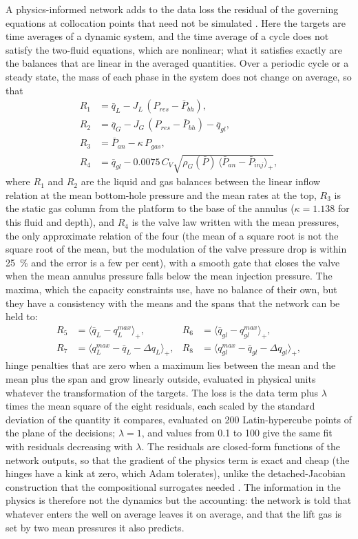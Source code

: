 \documentclass[a4paper,fleqn]{cas-sc}
\begin{document}
A physics-informed network adds to the data loss the residual of the governing equations at collocation points that need not be simulated \citep{raissi2019}. Here the targets are time averages of a dynamic system, and the time average of a cycle does not satisfy the two-fluid equations, which are nonlinear; what it satisfies exactly are the balances that are linear in the averaged quantities. Over a periodic cycle or a steady state, the mass of each phase in the system does not change on average, so that
\begin{align}
R_1 &= \bar q_L - J_L\,(P_{res} - \bar P_{bh}), \label{eq:r1}\\
R_2 &= \bar q_G - J_G\,(P_{res} - \bar P_{bh}) - \bar q_{gl}, \label{eq:r2}\\
R_3 &= \bar P_{an} - \kappa\,P_{gas}, \label{eq:r3}\\
R_4 &= \bar q_{gl} - 0.0075\,C_V\sqrt{\rho_G(\bar P)\,\langle \bar P_{an} - \bar P_{inj}\rangle_+}, \label{eq:r4}
\end{align}
where $R_1$ and $R_2$ are the liquid and gas balances between the linear inflow relation at the mean bottom-hole pressure and the mean rates at the top, $R_3$ is the static gas column from the platform to the base of the annulus ($\kappa = 1.138$ for this fluid and depth), and $R_4$ is the valve law written with the mean pressures, the only approximate relation of the four (the mean of a square root is not the square root of the mean, but the modulation of the valve pressure drop is within \SI{25}{\percent} and the error is a few per cent), with a smooth gate that closes the valve when the mean annulus pressure falls below the mean injection pressure. The maxima, which the capacity constraints use, have no balance of their own, but they have a consistency with the means and the spans that the network can be held to:
\begin{align}
R_5 &= \langle \bar q_L - q_L^{max}\rangle_+, & R_6 &= \langle \bar q_{gl} - q_{gl}^{max}\rangle_+, \label{eq:r56}\\
R_7 &= \langle q_L^{max} - \bar q_L - \Delta q_L\rangle_+, & R_8 &= \langle q_{gl}^{max} - \bar q_{gl} - \Delta q_{gl}\rangle_+, \label{eq:r78}
\end{align}
hinge penalties that are zero when a maximum lies between the mean and the mean plus the span and grow linearly outside, evaluated in physical units whatever the transformation of the targets. The loss is the data term plus $\lambda$ times the mean square of the eight residuals, each scaled by the standard deviation of the quantity it compares, evaluated on 200 Latin-hypercube points \citep{mckay1979} of the plane of the decisions; $\lambda = 1$, and values from 0.1 to 100 give the same fit with residuals decreasing with $\lambda$. The residuals are closed-form functions of the network outputs, so that the gradient of the physics term is exact and cheap (the hinges have a kink at zero, which Adam tolerates), unlike the detached-Jacobian construction that the compositional surrogates needed \citep{carvalho2026b}. The information in the physics is therefore not the dynamics but the accounting: the network is told that whatever enters the well on average leaves it on average, and that the lift gas is set by two mean pressures it also predicts.
\end{document}
